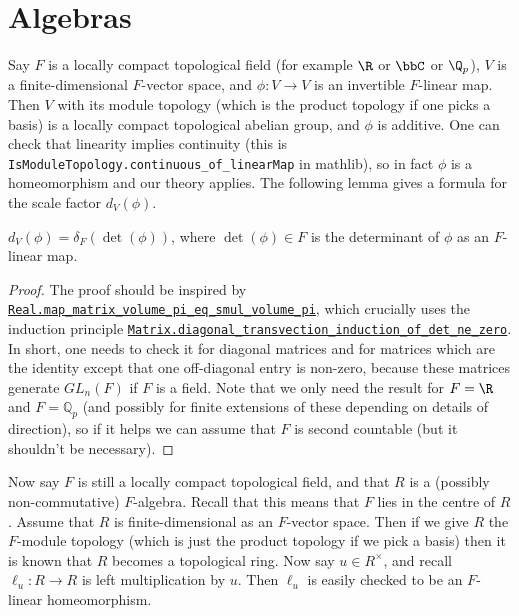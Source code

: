 \section{Algebras}

  Say $F$ is a locally compact topological field (for example $\R$ or $\bbC$ or $\Q_p$), $V$
  is a finite-dimensional $F$-vector space, and $\phi:V\to V$ is an invertible $F$-linear map.
  Then $V$ with its module topology (which is the product topology if one picks a basis)
  is a locally compact topological abelian group, and $\phi$ is additive.
  One can check that linearity implies continuity (this is {\tt IsModuleTopology.continuous\_of\_linearMap} in mathlib),
  so in fact $\phi$ is a homeomorphism
  and our theory applies. The following lemma gives a formula for the scale factor $d_V(\phi)$.

\begin{lemma}
  \label{MeasureTheory.addEquivAddHaarChar_eq_ringHaarChar_det}
  \leanok
  $d_V(\phi)=\delta_F(\det(\phi))$, where $\det(\phi)\in F$ is the determinant of $\phi$ as an $F$-linear map.
\end{lemma}
\begin{proof}
The proof should be inspired by \href{https://leanprover-community.github.io/mathlib4\_docs/Mathlib/MeasureTheory/Measure/Lebesgue/Basic.html\#Real.map\_matrix\_volume\_pi\_eq\_smul\_volume\_pi}{\tt Real.map\_matrix\_volume\_pi\_eq\_smul\_volume\_pi},
which crucially uses the induction principle \href{https://leanprover-community.github.io/mathlib4\_docs/Mathlib/LinearAlgebra/Matrix/Transvection.html\#Matrix.diagonal\_transvection\_induction\_of\_det\_ne\_zero}{\tt Matrix.diagonal\_transvection\_induction\_of\_det\_ne\_zero}.
In short, one needs to check it for diagonal matrices and for matrices which are the identity
except that one off-diagonal entry is non-zero, because these matrices generate $GL_n(F)$
if $F$ is a field. Note that we only need the result for $F=\R$
and $F=\mathbb{Q}_p$ (and possibly for finite extensions of these depending on
details of direction), so if it helps we can assume that $F$ is second countable
(but it shouldn't be necessary).
\end{proof}

Now say $F$ is still a locally compact topological field, and that $R$ is a (possibly
non-commutative) $F$-algebra. Recall that this means that $F$ lies in the centre of $R$.
Assume that $R$ is finite-dimensional as an $F$-vector space. Then if we give $R$ the
$F$-module topology (which is just the product topology if we pick a basis) then it is known
that $R$ becomes a topological ring. Now say $u\in R^\times$, and
recall $\ell_u:R\to R$ is left multiplication by $u$. Then $\ell_u$ is easily checked to be
an $F$-linear homeomorphism.

